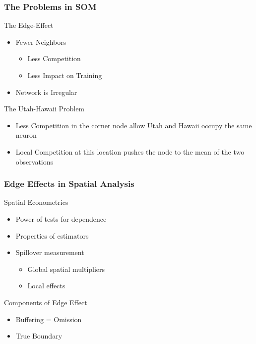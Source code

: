 \documentclass[nototal,handout]{beamer}
\begin{document}
\begin{frame}
	\frametitle{The Problems in SOM}
 
\begin{block}{The Edge-Effect}
 \begin{itemize}
 \item  Fewer Neighbors
 \begin{itemize}
 \item  Less Competition
 \item  Less Impact on Training
 \end{itemize}
 \item  Network is Irregular
 \end{itemize}
 \end{block} 
\begin{block}{The Utah-Hawaii Problem}
 \begin{itemize}
 \item  Less Competition in the corner node allow Utah and Hawaii occupy the same neuron
 \item  Local Competition at this location pushes the node to the mean of the two observations
 \end{itemize}
 \end{block} \end{frame} 

\begin{frame}
	\frametitle{Edge Effects in Spatial Analysis}
 
\begin{block}{Spatial Econometrics}
 \begin{itemize}
 \item  Power of tests for dependence
 \item  Properties of estimators
 \item  Spillover measurement
 \begin{itemize}
 \item  Global spatial multipliers
 \item  Local effects
 \end{itemize}
 \end{itemize}
 \end{block} 
\begin{block}{Components of Edge Effect}
 \begin{itemize}
 \item  Buffering = Omission
 \item  True Boundary
 \end{itemize}
 \end{block} \end{frame} 
\end{document}
